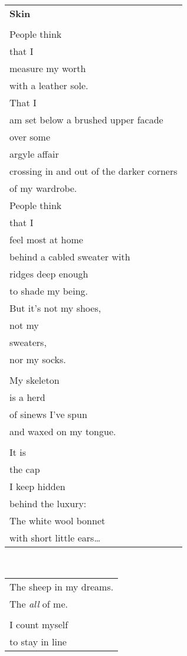 \documentclass{article}
\begin{document}
\begin{center}
\begin{tabular}{l}
\textbf{Skin} \\
\\
People think \\
that I \\
measure my worth \\
with a leather sole. \\
That I \\
am set below a brushed upper facade \\
over some \\
argyle affair \\
crossing in and out of the darker corners \\
of my wardrobe. \\
People think \\
that I \\
feel most at home \\
behind a cabled sweater with \\
ridges deep enough \\
to shade my being. \\
But it's not my shoes, \\
not my \\
sweaters, \\
nor my socks. \\
\\
My skeleton \\
is a herd \\
of sinews I've spun \\
and waxed on my tongue. \\
\\
It is \\
the cap \\
I keep hidden \\
behind the luxury: \\
The white wool bonnet \\
with short little ears\ldots{} \\
\end{tabular} \\
\begin{tabular}{l}
The sheep in my dreams. \\
The \textit{all} of me. \\
\\
I count myself \\
to stay in line \\

\end{tabular}
\end{center}
\end{document}
